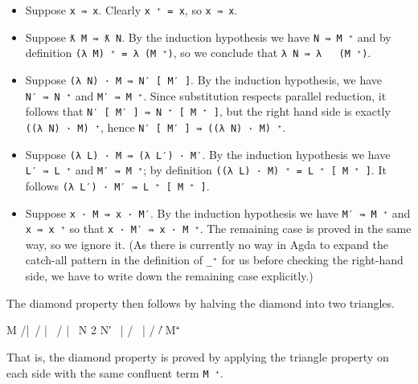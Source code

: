 \begin{itemize}
\item
  Suppose \texttt{x\ ⇛\ x}. Clearly \texttt{x\ ⁺\ =\ x}, so
  \texttt{x\ ⇛\ x}.
\item
  Suppose \texttt{ƛ\ M\ ⇛\ ƛ\ N}. By the induction hypothesis we have
  \texttt{N\ ⇛\ M\ ⁺} and by definition
  \texttt{(λ\ M)\ ⁺\ =\ λ\ (M\ ⁺)}, so we conclude that
  \texttt{λ\ N\ ⇛\ λ\ \ \ (M\ ⁺)}.
\item
  Suppose \texttt{(λ\ N)\ ·\ M\ ⇛\ N′\ {[}\ M′\ {]}}. By the induction
  hypothesis, we have \texttt{N′\ ⇛\ N\ ⁺} and \texttt{M′\ ⇛\ M\ ⁺}.
  Since substitution respects parallel reduction, it follows that
  \texttt{N′\ {[}\ M′\ {]}\ ⇛\ N\ ⁺\ {[}\ M\ ⁺\ {]}}, but the right hand
  side is exactly \texttt{((λ\ N)\ ·\ M)\ ⁺}, hence
  \texttt{N′\ {[}\ M′\ {]}\ ⇛\ ((λ\ N)\ ·\ M)\ ⁺}.
\item
  Suppose \texttt{(λ\ L)\ ·\ M\ ⇛\ (λ\ L′)\ ·\ M′}. By the induction
  hypothesis we have \texttt{L′\ ⇛\ L\ ⁺} and \texttt{M′\ ⇛\ M\ ⁺}; by
  definition \texttt{((λ\ L)\ ·\ M)\ ⁺\ =\ L\ ⁺\ {[}\ M\ ⁺\ {]}}. It
  follows \texttt{(λ\ L′)\ ·\ M′\ ⇛\ L\ ⁺\ {[}\ M\ ⁺\ {]}}.
\item
  Suppose \texttt{x\ ·\ M\ ⇛\ x\ ·\ M′}. By the induction hypothesis we
  have \texttt{M′\ ⇛\ M\ ⁺} and \texttt{x\ ⇛\ x\ ⁺} so that
  \texttt{x\ ·\ M′\ ⇛\ x\ ·\ M\ ⁺}. The remaining case is proved in the
  same way, so we ignore it. (As there is currently no way in Agda to
  expand the catch-all pattern in the definition of \texttt{\_⁺} for us
  before checking the right-hand side, we have to write down the
  remaining case explicitly.)
\end{itemize}

The diamond property then follows by halving the diamond into two
triangles.

\begin{myDisplay}
    M
   /|\
  / | \
 /  |  \
N   2   N′
 \  |  /
  \ | /
   \|/
    M⁺
\end{myDisplay}

That is, the diamond property is proved by applying the triangle
property on each side with the same confluent term \texttt{M\ ⁺}.

